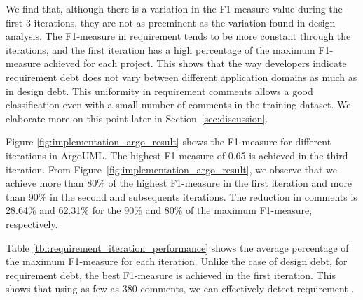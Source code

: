  We find that, although there is a variation in the F1-measure value during the first 3 iterations, they are not as preeminent as the variation found in design \SATD analysis. The F1-measure in requirement \SATD tends to be more constant through the iterations, and the first iteration has a high percentage of the maximum F1-measure achieved for each project. This shows that the way developers indicate requirement debt does not vary between different application domains as much as in design debt. This uniformity in requirement \SATD comments allows a good classification even with a small number of comments in the training dataset. We elaborate more on this point later in Section~\ref{sec:discussion}.

Figure \ref{fig:implementation_argo_result} shows the F1-measure for different iterations in ArgoUML. The highest F1-measure of 0.65 is achieved in the third iteration. From Figure~\ref{fig:implementation_argo_result}, we observe that we achieve more than 80\% of the highest F1-measure in the first iteration and more than 90\% in the second and subsequents iterations. The reduction in comments is 28.64\% and 62.31\% for the 90\% and 80\% of the maximum F1-measure, respectively.

Table \ref{tbl:requirement_iteration_performance} shows the average percentage of the maximum F1-measure for each iteration. Unlike the case of design debt, for requirement debt, the best F1-measure is achieved in the first iteration. This shows that using as few as 380 comments, we can effectively detect requirement \SATD{}.

